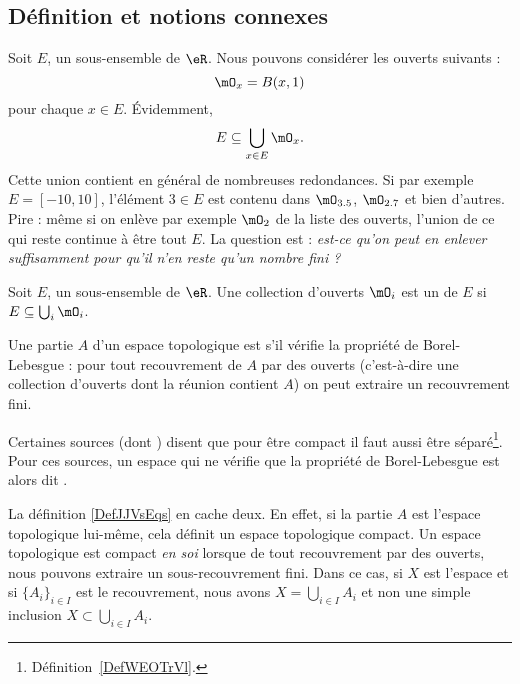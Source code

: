 \subsection{Définition et notions connexes}

Soit $E$, un sous-ensemble de $\eR$. Nous pouvons considérer les ouverts suivants :
\begin{equation}
    \mO_x=B(x,1)
\end{equation}
pour chaque $x\in E$. Évidemment,
\begin{equation}
    E\subseteq \bigcup_{x\in E}\mO_x.
\end{equation}
Cette union contient en général de nombreuses redondances. Si par exemple $E=[-10,10]$, l'élément $3\in E$ est contenu dans $\mO_{3.5}$, $\mO_{2.7}$ et bien d'autres. Pire : même si on enlève par exemple $\mO_2$ de la liste des ouverts, l'union de ce qui reste continue à être tout $E$. La question est : \emph{est-ce qu'on peut en enlever suffisamment pour qu'il n'en reste qu'un nombre fini ?}

\begin{definition} 
Soit $E$, un sous-ensemble de $\eR$. Une collection d'ouverts $\mO_i$ est un  de $E$ si $E\subseteq \bigcup_{i}\mO_i$.
\end{definition}

\begin{definition} \label{DefJJVsEqs}
    Une partie $A$ d'un espace topologique est  s'il vérifie la propriété de Borel-Lebesgue : pour tout recouvrement de $A$ par des ouverts (c'est-à-dire une collection d'ouverts dont la réunion contient $A$) on peut extraire un recouvrement fini.
\end{definition}

\begin{remark}
    Certaines sources (dont ) disent que pour être compact il faut aussi être séparé\footnote{Définition~\ref{DefWEOTrVl}.}. Pour ces sources, un espace qui ne vérifie que la propriété de Borel-Lebesgue est alors dit .
\end{remark}

\begin{normaltext}
    La définition \ref{DefJJVsEqs} en cache deux. En effet, si la partie \( A\) est l'espace topologique lui-même, cela définit un espace topologique compact. Un espace topologique est compact \emph{en soi} lorsque de tout recouvrement par des ouverts, nous pouvons extraire un sous-recouvrement fini. Dans ce cas, si \( X\) est l'espace et si \( \{ A_i \}_{i\in I}\) est le recouvrement, nous avons \( X=\bigcup_{i\in I}A_i\) et non une simple inclusion \( X\subset \bigcup_{i\in I}A_i\).
\end{normaltext}

